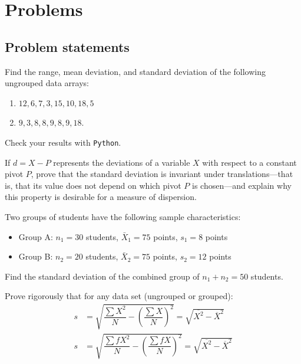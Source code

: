 \section*{Problems}

\subsection*{Problem statements}

\begin{problema}
	\label{prob:ba2e465}
	Find the range, mean deviation, and standard deviation of the following ungrouped data arrays:
	\begin{enumerate}
		\item $12, 6, 7, 3, 15, 10, 18, 5$
		\item $9, 3, 8, 8, 9, 8, 9, 18.$
	\end{enumerate}
	Check your results with \texttt{Python}.
\end{problema}

\begin{problema}
	\label{prob:c5833ad}
	If $d=X-P$ represents the deviations of a variable $X$ with respect to a constant pivot $P$, prove that the standard deviation is invariant under translations---that is, that its value does not depend on which pivot $P$ is chosen---and explain why this property is desirable for a measure of dispersion.
\end{problema}

\begin{problema}
	\label{prob:d87f55c}
	Two groups of students have the following sample characteristics:
	\begin{itemize}
		\item Group A: $n_1 = 30$ students, $\bar{X}_1 = 75$ points, $s_1 = 8$ points
		\item Group B: $n_2 = 20$ students, $\bar{X}_2 = 75$ points, $s_2 = 12$ points
	\end{itemize}
	Find the standard deviation of the combined group of $n_1 + n_2 = 50$ students.
\end{problema}

\begin{problema}
	\label{prob:6112df0}
	Prove rigorously that for any data set (ungrouped or grouped):
	\begin{align}
		s &= \sqrt{\dfrac{\sum X^{2}}{N}-\left( \dfrac{\sum X}{N} \right)^{2}} = \sqrt{\overline{X^{2}}-\overline{X}^{2}}\\
		s &= \sqrt{\dfrac{\sum fX^{2}}{N}-\left( \dfrac{\sum fX}{N} \right)^{2}} = \sqrt{\overline{X^{2}}-\overline{X}^{2}}
	\end{align}
\end{problema}

